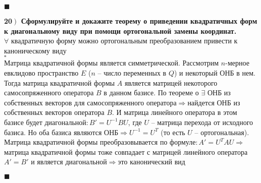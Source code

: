 \documentclass[a4paper,12pt]{article}
\begin{document}
\begin{flushright}
	$\blacksquare$
\end{flushright}
\textbf{20$\left.\right)$ Сформулируйте и докажите теорему о приведении квадратичных форм к диагональному виду при помощи ортогональной замены координат.}\\
$\forall$ квадратичную форму можно ортогональным преобразованием привести к каноническому виду\\
$\square$\\
Матрица квадратичной формы является симметрической. Рассмотрим $n$-мерное евклидово пространство $E$ ($n$ -- число переменных в $Q$) и некоторый ОНБ в нем. Тогда матрица квадратичной формы $A$ является матрицей некоторого самосопряженного оператора $B$ в данном базисе. По теореме о $\exists$ ОНБ из собственных векторов для самосопряженного оператора$\Rightarrow$найдется ОНБ из собственных векторов оператора $B$. И матрица линейного оператора в этом базисе будет диагональной$: B'=U^{-1}BU$, где $U$ -- матрица перехода от исходного базиса. Но оба базиса являются ОНБ$\Rightarrow U^{-1}=U^T$ (то есть $U$ -- ортогональная). Матрица квадратичной формы преобразовывается по формуле$: A'=U^TAU\Rightarrow$матрица квадратичной формы тоже совпадает с матрицей линейного оператора $A'=B'$ и является диагональной$\Rightarrow$это канонический вид
\begin{flushright}
	$\blacksquare$
\end{flushright}
\end{document}

